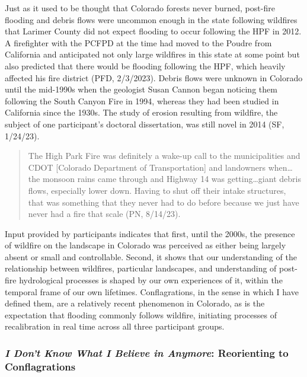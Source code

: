\documentclass[
]{article}
\begin{document}
Just as it used to be thought that Colorado forests never burned, post-fire flooding and debris flows were uncommon enough in the state following wildfires that Larimer County did not expect flooding to occur following the HPF in 2012. A firefighter with the PCFPD at the time had moved to the Poudre from California and anticipated not only large wildfires in this state at some point but also predicted that there would be flooding following the HPF, which heavily affected his fire district (PFD, 2/3/2023). Debris flows were unknown in Colorado until the mid-1990s when the geologist Susan Cannon began noticing them following the South Canyon Fire in 1994, whereas they had been studied in California since the 1930s. The study of erosion resulting from wildfire, the subject of one participant's doctoral dissertation, was still novel in 2014 (SF, 1/24/23).

\begin{quote}
The High Park Fire was definitely a wake-up call to the municipalities and CDOT {[}Colorado Department of Transportation{]} and landowners when\ldots the monsoon rains came through and Highway 14 was getting\ldots giant debris flows, especially lower down. Having to shut off their intake structures, that was something that they never had to do before because we just have never had a fire that scale (PN, 8/14/23).
\end{quote}

Input provided by participants indicates that first, until the 2000s, the presence of wildfire on the landscape in Colorado was perceived as either being largely absent or small and controllable. Second, it shows that our understanding of the relationship between wildfires, particular landscapes, and understanding of post-fire hydrological processes is shaped by our own experiences of it, within the temporal frame of our own lifetimes. Conflagrations, in the sense in which I have defined them, are a relatively recent phenomenon in Colorado, as is the expectation that flooding commonly follows wildfire, initiating processes of recalibration in real time across all three participant groups.

\subsubsection{\texorpdfstring{\emph{I Don't Know What I Believe in Anymore}: Reorienting to Conflagrations}{I Don't Know What I Believe in Anymore: Reorienting to Conflagrations}}\label{i-dont-know-what-i-believe-in-anymore-reorienting-to-conflagrations}
\end{document}
